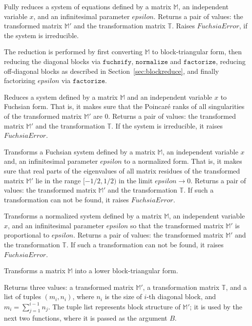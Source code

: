 \documentclass{elsarticle}
\newcommand{\F}[1]{\texttt{#1}} %
\newcommand{\M}[1]{\mathbb{#1}} %
\newcommand{\functionitem}[2]{\item[$\F{#1}(#2)$\hfill\textit{(function)}]}
\begin{document}
\begin{description}[style=nextline]

\functionitem{epsilon\_form}{\M M, x, epsilon, seed=0}
Fully reduces a system of equations defined by a matrix $\M M$, an independent variable $x$, and an infinitesimal parameter $epsilon$.
Returns a pair of values: the transformed matrix $\M M'$ and the transformation matrix $\M T$.
Raises $FuchsiaError$, if the system is irreducible.

The reduction is performed by first converting $\M M$ to block-triangular form, then reducing the diagonal blocks via $\F{fuchsify}$, $\F{normalize}$ and $\F{factorize}$, reducing off-diagonal blocks as described in Section~\ref{sec:blockreduce}, and finally factorizing $epsilon$ via $\F{factorize}$.

\functionitem{fuchsify}{\M M, x, seed=0}
Reduces a system defined by a matrix $\M M$ and an independent variable $x$ to Fuchsian form.
That is, it makes sure that the Poincar\'e ranks of all singularities of the transformed matrix $\M M'$ are $0$.
Returns a pair of values: the transformed matrix $\M M'$ and the transformation $\M T$.
If the system is irreducible, it raises $FuchsiaError$.

\functionitem{normalize}{\M M, x, epsilon, seed=0}
Transforms a Fuchsian system defined by a matrix $\M M$, an independent variable $x$ and, an infinitesimal parameter $epsilon$ to a normalized form.
That is, it makes sure that real parts of the eigenvalues of all matrix residues of the transformed matrix $\M M'$ lie in the range $[-1/2, 1/2)$ in the limit $epsilon\to0$.
Returns a pair of values: the transformed matrix $\M M'$ and the transformation $\M T$.
If such a transformation can not be found, it raises $FuchsiaError$.

\functionitem{factorize}{\M M, x, epsilon, seed=0}
Transforms a normalized system defined by a matrix $\M M$, an independent variable $x$, and an infinitesimal parameter $epsilon$ so that the
transformed matrix $\M M'$ is proportional to $epsilon$.
Returns a pair of values: the transformed matrix $\M M'$ and the transformation $\M T$.
If such a transformation can not be found, it raises $FuchsiaError$.

\functionitem{block\_triangular\_form}{\M M}
Transforms a matrix $\M M$ into a lower block-triangular form.

Returns three values: a transformed matrix $\M M'$, a transformation matrix $\M T$, and a list of tuples $(m_i, n_i)$, where $n_i$ is the size of $i$-th diagonal block, and $m_i = \sum_{j=1}^{i-1} n_j$.
The tuple list represents block structure of $\M M'$; it is used by the next two functions, where it is passed as the argument $B$.


\end{description}
\end{document}
